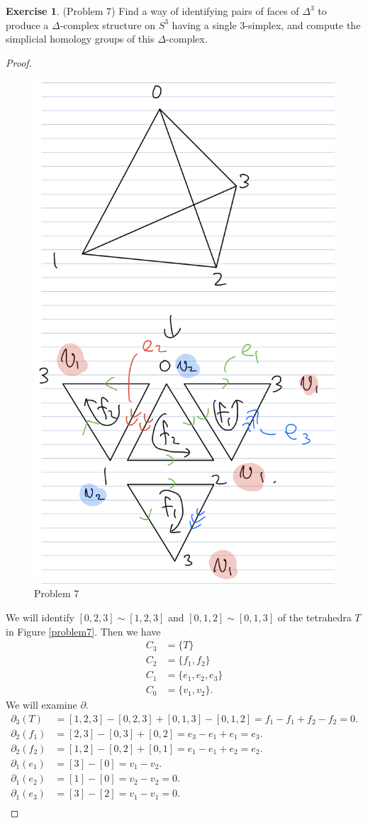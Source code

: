 \documentclass[12pt, psamsfonts]{amsart}
\theoremstyle{definition}
\newtheorem*{exer}{Exercise}
\theoremstyle{remark}
\numberwithin{equation}{section}
\begin{document}
\begin{exer}{(Problem 7)}
  Find a way of identifying pairs of faces of $\Delta^3$ to produce a $\Delta$-complex structure on $S^3$ having a single 3-simplex, and compute the simplicial homology groups of this $\Delta$-complex.
\end{exer}

\begin{proof}
  \begin{figure}
    \includegraphics[width=.5\linewidth]{problem7.jpeg}
    \caption{Problem 7}
    \label{fig:problem7}
  \end{figure}
  We will identify $[0, 2, 3] \sim [1, 2, 3]$ and $[0, 1, 2] \sim [0, 1, 3]$ of the tetrahedra $T$ in Figure \ref{problem7}.
  Then we have
  \begin{align*}
    C_3 &= \{ T \} \\
    C_2 &= \{ f_1, f_2 \} \\
    C_1 &= \{ e_1, e_2, e_3 \} \\
    C_0 &= \{ v_1, v_2 \}.
  \end{align*}
  We will examine $\partial$.
  \begin{align*}
    \partial_3(T) &= [1, 2, 3] - [0, 2, 3] + [0, 1, 3] - [0, 1, 2] = f_1 - f_1 + f_2 - f_2 = 0. \\
    \partial_2(f_1) &= [2, 3] - [0, 3] + [0, 2] = e_3 - e_1 + e_1 = e_3. \\
    \partial_2(f_2) &= [1, 2] - [0, 2] + [0, 1] = e_1 - e_1 + e_2 = e_2. \\
    \partial_1(e_1) &= [3] - [0] = v_1 - v_2. \\
    \partial_1(e_2) &= [1] - [0] = v_2 - v_2 = 0. \\
    \partial_1(e_3) &= [3] - [2] = v_1 - v_1 = 0. \\
  \end{align*}


\end{proof}
\end{document}
